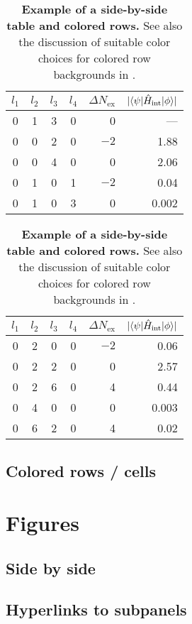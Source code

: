 \begin{table}
	\centering 
	\caption{\textbf{Example of a side-by-side table and colored rows.} See also the discussion of suitable color choices for colored row backgrounds in .}
	\label{tab:table3}
	\vspace{5ex}
	\begin{tabular}{ccccrr} 
		\toprule
		$l_1$ & $l_2$ & $l_3$ & $l_4$ & $\Delta N_\text{ex}$ & $|\langle \psi | \hat{H}_\text{int} | \phi \rangle|$  \\ 
		\midrule 
		\rowcolor{pqred} 0 & 1 & 3 & 0 & 0 & ---\\
		0 & 0 & 2 & 0 & $-2$ & 1.88\\
		\rowcolor{pqblue} 0 & 0 & 4 & 0 & 0 & 2.06\\
		0 & 1 & 0 & 1 & $-2$ & 0.04\\
		\rowcolor{pqyellow} 0 & 1 & 0 & 3 & 0 & 0.002\\
		\bottomrule
	\end{tabular}
	\hspace{0.5cm}
	\begin{tabular}{ccccrr} 
		\toprule
		$l_1$ & $l_2$ & $l_3$ & $l_4$ & $\Delta N_\text{ex}$ & $|\langle \psi | \hat{H}_\text{int} | \phi \rangle|$  \\ 
		\midrule 
		0 & 2 & 0 & 0 & $-2$ & 0.06\\
		\rowcolor{pqblue} 0 & 2 & 2 & 0 & 0 & 2.57\\
		0 & 2 & 6 & 0 & 4 & 0.44\\
		\rowcolor{pqyellow} 0 & 4 & 0 & 0 & 0 & 0.003\\
		0 & 6 & 2 & 0 & 4 & 0.02\\
		\bottomrule
	\end{tabular}
\end{table}





\subsection{Colored rows / cells}
\section{Figures}
\subsection{Side by side}
\subsection{Hyperlinks to subpanels}
